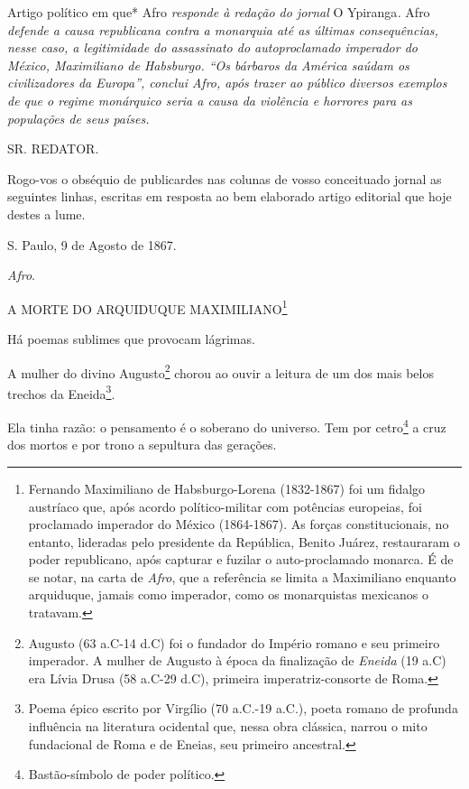 \begin{didascalia}
Artigo político em que* Afro \emph{responde à redação do jornal} O
Ypiranga\emph{.} Afro \emph{defende a causa republicana contra a
monarquia até as últimas consequências, nesse caso, a legitimidade do
assassinato do autoproclamado imperador do México, Maximiliano de
Habsburgo. ``Os bárbaros da América saúdam os civilizadores da Europa'',
conclui Afro, após trazer ao público diversos exemplos de que o regime
monárquico seria a causa da violência e horrores para as populações de
seus países.}
\end{didascalia}

\asterisc{}

SR. REDATOR.

Rogo-vos o obséquio de publicardes nas colunas de vosso conceituado
jornal as seguintes linhas, escritas em resposta ao bem elaborado artigo
editorial que hoje destes a lume.

S. Paulo, 9 de Agosto de 1867.

\emph{Afro}.

A MORTE DO ARQUIDUQUE MAXIMILIANO\footnote{Fernando Maximiliano de
  Habsburgo-Lorena (1832-1867) foi um fidalgo austríaco que, após acordo
  político-militar com potências europeias, foi proclamado imperador do
  México (1864-1867). As forças constitucionais, no entanto, lideradas
  pelo presidente da República, Benito Juárez, restauraram o poder
  republicano, após capturar e fuzilar o auto-proclamado monarca. É de
  se notar, na carta de \emph{Afro}, que a referência se limita a
  Maximiliano enquanto arquiduque, jamais como imperador, como os
  monarquistas mexicanos o tratavam.}

Há poemas sublimes que provocam lágrimas.

A mulher do divino Augusto\footnote{Augusto (63 a.C-14 d.C) foi o
  fundador do Império romano e seu primeiro imperador. A mulher de
  Augusto à época da finalização de \emph{Eneida} (19 a.C) era Lívia
  Drusa (58 a.C-29 d.C), primeira imperatriz-consorte de Roma.} chorou
ao ouvir a leitura de um dos mais belos trechos da Eneida\footnote{
  Poema épico escrito por Virgílio (70 a.C.-19 a.C.), poeta romano de
  profunda influência na literatura ocidental que, nessa obra clássica,
  narrou o mito fundacional de Roma e de Eneias, seu primeiro ancestral.}.

Ela tinha razão: o pensamento é o soberano do universo. Tem por
cetro\footnote{Bastão-símbolo de poder político.} a cruz dos mortos e
por trono a sepultura das gerações.

